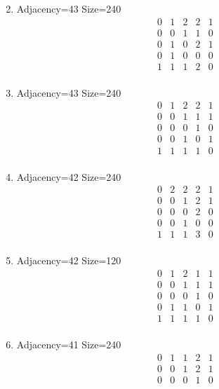 \documentclass[12pt]{article}
\begin{document}
\begin{multicols}{3}
\begin{enumerate}
\begin{equation*}
\end{equation*}
\item Adjacency=43 Size=240
\begin{equation*}
\begin{array}{ccccc}
0&1&2&2&1\\
0&0&1&1&0\\
0&1&0&2&1\\
0&1&0&0&0\\
1&1&1&2&0\\
\end{array}
\end{equation*}
\item Adjacency=43 Size=240
\begin{equation*}
\begin{array}{ccccc}
0&1&2&2&1\\
0&0&1&1&1\\
0&0&0&1&0\\
0&0&1&0&1\\
1&1&1&1&0\\
\end{array}
\end{equation*}
\item Adjacency=42 Size=240
\begin{equation*}
\begin{array}{ccccc}
0&2&2&2&1\\
0&0&1&2&1\\
0&0&0&2&0\\
0&0&1&0&0\\
1&1&1&3&0\\
\end{array}
\end{equation*}
\item Adjacency=42 Size=120
\begin{equation*}
\begin{array}{ccccc}
0&1&2&1&1\\
0&0&1&1&1\\
0&0&0&1&0\\
0&1&1&0&1\\
1&1&1&1&0\\
\end{array}
\end{equation*}
\item Adjacency=41 Size=240
\begin{equation*}
\begin{array}{ccccc}
0&1&1&2&1\\
0&0&1&2&1\\
0&0&0&1&0\\

\end{array}
\end{equation*}
\end{enumerate}
\end{multicols}
\end{document}
